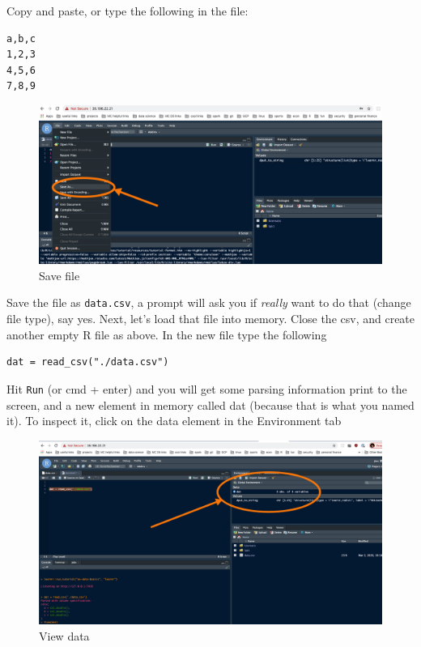 \documentclass[]{book}
\begin{document}
Copy and paste, or type the following in the file:

\begin{verbatim}
a,b,c
1,2,3
4,5,6
7,8,9
\end{verbatim}

\begin{figure}
\centering
\includegraphics{./pics/lab1_ss7.png}
\caption{Save file}
\end{figure}

Save the file as \texttt{data.csv}, a prompt will ask you if \emph{really} want to do that (change file type), say yes. Next, let's load that file into memory. Close the csv, and create another empty R file as above. In the new file type the following

\begin{verbatim}
dat = read_csv("./data.csv")
\end{verbatim}

Hit \texttt{Run} (or cmd + enter) and you will get some parsing information print to the screen, and a new element in memory called dat (because that is what you named it). To inspect it, click on the data element in the Environment tab

\begin{figure}
\centering
\includegraphics{./pics/lab1_ss8.png}
\caption{View data}
\end{figure}
\end{document}

